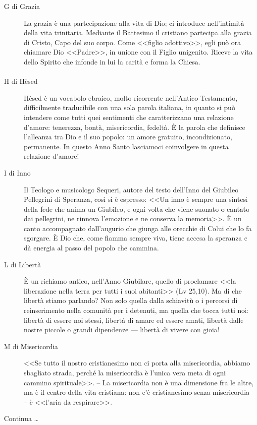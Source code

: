 \begin{description}
  \item[G di Grazia] La grazia è una partecipazione alla vita di Dio; ci introduce nell'intimità della vita trinitaria. Mediante il Battesimo il cristiano partecipa alla grazia di Cristo, Capo del suo corpo. Come <<figlio adottivo>>, egli può ora chiamare Dio <<Padre>>, in unione con il Figlio unigenito. Riceve la vita dello Spirito che infonde in lui la carità e forma la Chiesa.
\end{description}

\paragraph{}
\vspace*{-\parskip}

\begin{description}

  \item[H di Hèsed] Hèsed è un vocabolo ebraico, molto ricorrente nell'Antico Testamento, difficilmente traducibile con una sola parola italiana, in quanto si può intendere come tutti quei sentimenti che caratterizzano una relazione d'amore: tenerezza, bontà, misericordia, fedeltà. È la parola che definisce l'alleanza tra Dio e il suo popolo: un amore gratuito, incondizionato, permanente. In questo Anno Santo lasciamoci coinvolgere in questa relazione d'amore!
\end{description}

\begin{description}
  \item[I di Inno] Il Teologo e musicologo Sequeri, autore del testo dell'Inno del Giubileo Pellegrini di Speranza, così si è espresso: <<Un inno è sempre una sintesi della fede che anima un Giubileo, e ogni volta che viene suonato o cantato dai pellegrini, ne rinnova l'emozione e ne conserva la memoria>>. È un canto accompagnato dall'augurio che giunga alle orecchie di Colui che lo fa sgorgare. È Dio che, come fiamma sempre viva, tiene accesa la speranza e dà energia al passo del popolo che cammina.

  \item[L di Libertà] È un richiamo antico, nell'Anno Giubilare, quello di proclamare <<la liberazione nella terra per tutti i suoi abitanti>> (Lv 25,10). Ma di che libertà stiamo parlando? Non solo quella dalla schiavitù o i percorsi di reinserimento nella comunità per i detenuti, ma quella che tocca tutti noi: libertà di essere noi stessi, libertà di amare ed essere amati, libertà dalle nostre piccole o grandi dipendenze --- libertà di vivere con gioia!

  \item[M di Misericordia] <<Se tutto il nostro cristianesimo non ci porta alla misericordia, abbiamo sbagliato strada, perché la misericordia è l'unica vera meta di ogni cammino spirituale>>. -- La misericordia non è una dimensione fra le altre, ma è il centro della vita cristiana: non c'è cristianesimo senza misericordia -- è <<l'aria da respirare>>.
\end{description}

Continua \ldots

